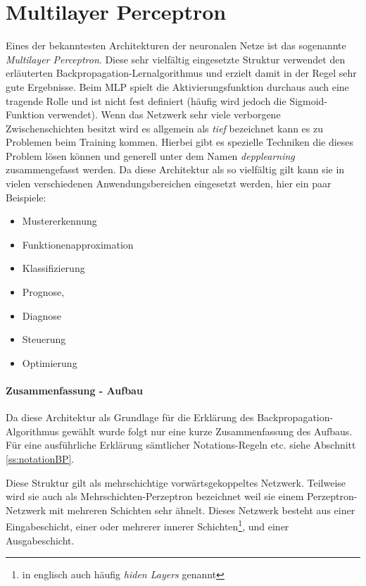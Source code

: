 \section{Multilayer Perceptron}

Eines der bekanntesten Architekturen der neuronalen Netze ist das sogenannte \emph{Multilayer Perceptron}. Diese sehr vielfältig eingesetzte Struktur verwendet den erläuterten Backpropagation-Lernalgorithmus und erzielt damit in der Regel sehr gute Ergebnisse. Beim MLP spielt die Aktivierungsfunktion durchaus auch eine tragende Rolle und ist nicht fest definiert (häufig wird jedoch die Sigmoid-Funktion verwendet). Wenn das Netzwerk sehr viele verborgene Zwischenschichten besitzt wird es allgemein als \emph{tief} bezeichnet kann es zu Problemen beim Training kommen. Hierbei gibt es spezielle Techniken die dieses Problem lösen können und generell unter dem Namen \emph{depplearning} zusammengefasst werden. Da diese Architektur als so vielfältig gilt kann sie in vielen verschiedenen Anwendungsbereichen eingesetzt werden, hier ein paar Beispiele: 

\begin{multicols}{2}
\begin{itemize}
\item Mustererkennung 
\item Funktionenapproximation
\item Klassifizierung
\item Prognose,
\item Diagnose
\item Steuerung 
\item Optimierung
\end{itemize}
\end{multicols}

\paragraph{Zusammenfassung - Aufbau}

Da diese Architektur als Grundlage für die Erklärung des Backpropagation-Algorithmus gewählt wurde folgt nur eine kurze Zusammenfassung des Aufbaus. Für eine ausführliche Erklärung sämtlicher Notations-Regeln etc. siehe Abschnitt \ref{ss:notationBP}. 

Diese Struktur gilt als mehrschichtige vorwärtsgekoppeltes Netzwerk. Teilweise wird sie auch als Mehrschichten-Perzeptron bezeichnet weil sie einem Perzeptron-Netzwerk mit mehreren Schichten sehr ähnelt. Dieses Netzwerk besteht aus einer Eingabeschicht, einer oder mehrerer innerer Schichten\footnote{in englisch auch häufig \emph{hiden Layers} genannt}, und einer Ausgabeschicht. 

